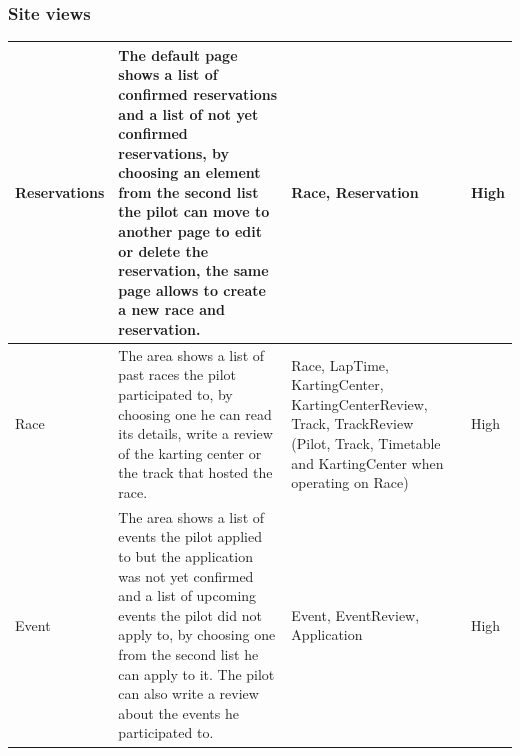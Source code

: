 \documentclass{beamer}
\begin{document}
\begin{frame}
    \frametitle{Site views}
    \begin{table}
        \centering
        \tiny
        \setlength{\tabcolsep}{1pt}
        \begin{tabular}{|m{2cm}|m{4cm}|m{3cm}|m{1cm}|}
        \hline
        Reservations & The default page shows a list of confirmed reservations and a list of not yet confirmed reservations,
        by choosing an element from the second list the pilot can move to another page to edit or delete the reservation, the same page allows
        to create a new race and reservation.
         & Race, Reservation & High \\
        \hline
        Race & The area shows a list of past races the pilot participated to, by choosing one he can read its details,
        write a review of the karting center or the track that hosted the race.
         & Race, LapTime, KartingCenter, KartingCenterReview, Track, TrackReview
        (Pilot, Track, Timetable and KartingCenter when operating on Race) & High \\
        \hline
        Event & The area shows a list of events the pilot applied to but 
        the application was not yet confirmed and 
        a list of upcoming events the pilot did not apply to, by choosing one from the second list
         he can apply to it. The pilot can also write a review about the events he participated to.
         & Event, EventReview, Application & High \\
        \hline
        \end{tabular}
    \end{table}
\end{frame}
\end{document}
